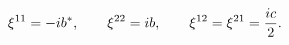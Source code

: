 \begin{equation}
\xi^{11}=-i b^*, 
\qquad
\xi^{22}
=
i b, 
\qquad
\xi^{12}=
\xi^{21}
=
{ic\over 2} .
\end{equation} 
